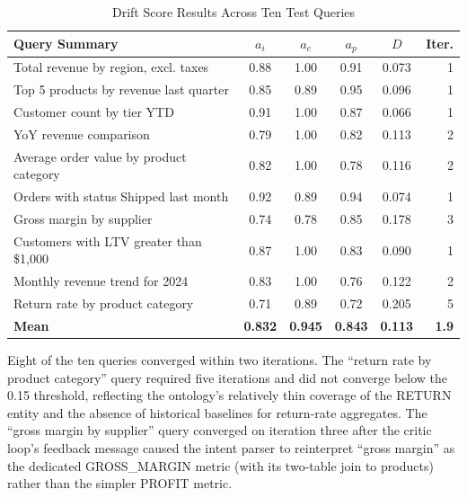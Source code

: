 \documentclass[12pt,a4paper]{report}
\begin{document}
\begin{table}[H]
  \centering
  \caption{Drift Score Results Across Ten Test Queries}
  \label{tab:drift-results}
  \renewcommand{\arraystretch}{1.3}
  \begin{tabularx}{\textwidth}{@{}Xccccr@{}}
    \toprule
    \textbf{Query Summary} & $a_i$ & $a_c$ & $a_p$ & $D$ & \textbf{Iter.} \\
    \midrule
    Total revenue by region, excl. taxes       & 0.88 & 1.00 & 0.91 & 0.073 & 1 \\
    Top 5 products by revenue last quarter     & 0.85 & 0.89 & 0.95 & 0.096 & 1 \\
    Customer count by tier YTD                 & 0.91 & 1.00 & 0.87 & 0.066 & 1 \\
    YoY revenue comparison                     & 0.79 & 1.00 & 0.82 & 0.113 & 2 \\
    Average order value by product category    & 0.82 & 1.00 & 0.78 & 0.116 & 2 \\
    Orders with status Shipped last month      & 0.92 & 0.89 & 0.94 & 0.074 & 1 \\
    Gross margin by supplier                   & 0.74 & 0.78 & 0.85 & 0.178 & 3 \\
    Customers with LTV greater than \$1,000    & 0.87 & 1.00 & 0.83 & 0.090 & 1 \\
    Monthly revenue trend for 2024             & 0.83 & 1.00 & 0.76 & 0.122 & 2 \\
    Return rate by product category            & 0.71 & 0.89 & 0.72 & 0.205 & 5 \\
    \midrule
    \textbf{Mean} & \textbf{0.832} & \textbf{0.945} & \textbf{0.843} & \textbf{0.113} & \textbf{1.9} \\
    \bottomrule
  \end{tabularx}
\end{table}

Eight of the ten queries converged within two iterations. The ``return rate by product category'' query required five iterations and did not converge below the 0.15 threshold, reflecting the ontology's relatively thin coverage of the RETURN entity and the absence of historical baselines for return-rate aggregates. The ``gross margin by supplier'' query converged on iteration three after the critic loop's feedback message caused the intent parser to reinterpret ``gross margin'' as the dedicated GROSS\_MARGIN metric (with its two-table join to products) rather than the simpler PROFIT metric.
\end{document}
